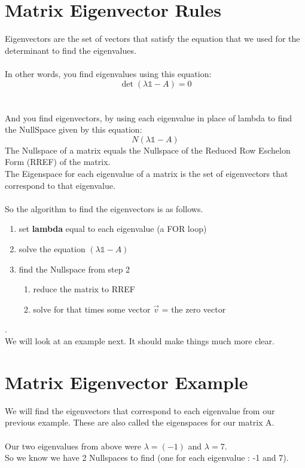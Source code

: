 \documentclass{article}
\begin{document}
\newpage
\section{Matrix Eigenvector Rules}
Eigenvectors are the set of vectors that satisfy the equation that we used for the determinant to find the eigenvalues.
\\
\\
In other words, you find eigenvalues using this equation:
\[
\det ( \lambda \mathbb{1} - A ) = 0
\] 
\\
\\
And you find eigenvectors, by using each eigenvalue in place of lambda to find the NullSpace given by this equation:
\[
N( \lambda \mathbb{1} - A ) 
\]
The Nullspace of a matrix equals the Nullspace of the Reduced Row Eschelon Form (RREF) of the matrix.
\\
The Eigenspace for each eigenvalue of a matrix is the set of eigenvectors that correspond to that eigenvalue.
\\
\\
So the algorithm to find the eigenvectors is as follows.
\begin{enumerate}
	\item set \textbf{lambda} equal to each eigenvalue (a FOR loop)
	\item solve the equation $ ( \lambda \mathbb{1} - A ) $
	\item find the Nullspace from step 2
	\begin{enumerate}
		\item reduce the matrix to RREF
		\item solve for that times some vector $\vec{v}$  = the zero vector
	\end{enumerate}
\end{enumerate}
.
\\


We will look at an example next.  It should make things much more clear.


\newpage
\section{Matrix Eigenvector Example}
We will find the eigenvectors that correspond to each eigenvalue from our previous example.
These are also called the eigenspaces for our matrix A.
\\
\\
Our two eigenvalues from above were $\lambda = (-1)$ and $\lambda = 7$.
\\
So we know we have 2 Nullspaces to find (one for each eigenvalue :  -1 and 7).
\\
\\
\end{document}
